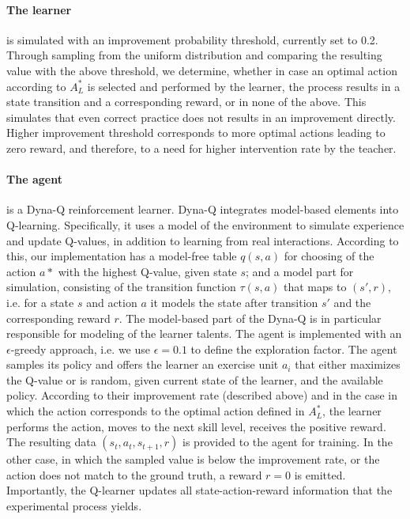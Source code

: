 \documentclass{article}
\begin{document}
    \paragraph{The \textbf{learner}} is simulated with an improvement probability threshold, currently set to 0.2. Through sampling from the uniform distribution and comparing the resulting value with the above threshold, we  determine, whether in case an optimal action according to $A^*_L$ is selected  and performed by the learner, the process results in  a state transition and a corresponding  reward, or in none of the above.  This simulates that even correct practice does not  results in an improvement directly.  Higher improvement threshold corresponds to more optimal actions leading to zero reward, and therefore, to a need for  higher intervention rate by the teacher. 
    \paragraph{The \textbf{agent}} is a Dyna-Q reinforcement learner. Dyna-Q integrates model-based elements into Q-learning. Specifically, it uses a model of the environment to simulate experience and update Q-values, in addition to learning from real interactions. According to this, our implementation has a model-free table $q(s,a)$ for choosing of the action $a*$ with the highest Q-value, given state $s$;  and a model part for simulation, consisting of the transition function $\tau(s,a)$ that maps to $(s',r)$, i.e. for a state $s$ and action $a$ it models the state after transition $s'$ and the corresponding reward $r$.  The model-based part of the Dyna-Q is in particular responsible for modeling of the learner talents.  The agent is implemented with an $\epsilon$-greedy approach, i.e. we use  $\epsilon=0.1$ to define the exploration factor.   The agent samples its policy and offers the learner an exercise unit $a_i$ that either maximizes the Q-value or is random, given current state of the learner, and the available policy.  According to their improvement rate (described above) and in the case in which the action corresponds to the optimal action defined in $A^*_L$,  the learner performs the action, moves to the next skill level, receives the positive reward. The resulting data $(s_t, a_t, s_{t+1},r)$ is provided to the agent for training.  In the other case, in which the sampled value is below the improvement rate, or the action does not match to the ground truth, a reward $r=0$ is emitted. 
     Importantly, the Q-learner updates all state-action-reward information that the experimental process yields.
\end{document}
